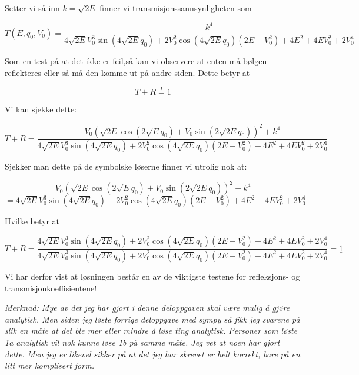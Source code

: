\documentclass[a4paper,norsk, 10pt]{article}
\numberwithin{equation}{section}
\begin{document}
Setter vi så inn $k = \sqrt{2E}$ finner vi transmisjonssannsynligheten som

\begin{equation}
T(E,q_0,V_0) = \frac{k^4}{4\sqrt{2E}V_0^3\sin(4\sqrt{2E} q_0) + 2V_0^2\cos(4\sqrt{2E} q_0)(2E - V_0^2)+4E^2 +4EV_0^2 + 2V_0^4}
\end{equation} 

Som en test på at det ikke er feil,så kan vi observere at enten må bølgen reflekteres eller så må den komme ut på andre siden. Dette betyr at 

$$
T + R \overset{!}{=} 1
$$


Vi kan sjekke dette:

$$
T + R = \frac{V_0\left(\sqrt{2E}\cos(2\sqrt{E}q_0) + V_0\sin(2\sqrt{2E} q_0)\right)^2 + k^4}{4\sqrt{2E}V_0^3\sin(4\sqrt{2E} q_0) + 2V_0^2\cos(4\sqrt{2E} q_0)(2E - V_0^2)+4E^2 +4EV_0^2 + 2V_0^4}
$$

Sjekker man dette på de symbolske løserne finner vi utrolig nok at:

$$
V_0\left(\sqrt{2E}\cos(2\sqrt{E}q_0) + V_0\sin(2\sqrt{2E} q_0)\right)^2 + k^4
$$
$$
= 4\sqrt{2E}V_0^3\sin(4\sqrt{2E} q_0) + 2V_0^2\cos(4\sqrt{2E} q_0)(2E - V_0^2)+4E^2 +4EV_0^2 + 2V_0^4
$$

Hvilke betyr at

$$
T + R = \frac{4\sqrt{2E}V_0^3\sin(4\sqrt{2E} q_0) + 2V_0^2\cos(4\sqrt{2E} q_0)(2E - V_0^2)+4E^2 +4EV_0^2 + 2V_0^4}{4\sqrt{2E}V_0^3\sin(4\sqrt{2E} q_0) + 2V_0^2\cos(4\sqrt{2E} q_0)(2E - V_0^2)+4E^2 +4EV_0^2 + 2V_0^4} = \underline{\underline{1}}
$$

Vi har derfor vist at løsningen består en av de viktigste testene for refleksjons- og transmisjonkoeffisientene!

\textit{Merknad: Mye av det jeg har gjort i denne deloppgaven skal være mulig å gjøre analytisk. Men siden jeg løste forrige deloppgave med sympy så fikk jeg svarene på slik en måte at det ble mer eller mindre å løse ting analytisk. Personer som løste 1a analytisk vil nok kunne løse 1b på samme måte. Jeg vet at noen har gjort dette. Men jeg er likevel sikker på at det jeg har skrevet er helt korrekt, bare på en litt mer komplisert form.}
\end{document}
